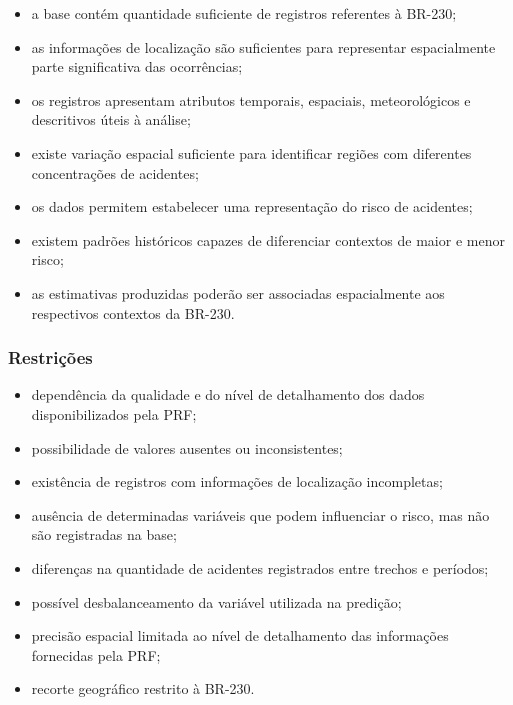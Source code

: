 \documentclass[11pt,a4paper]{article}
\begin{document}
\begin{itemize}

    \item a base contém quantidade suficiente de registros referentes à BR-230;

    \item as informações de localização são suficientes para representar espacialmente parte significativa das ocorrências;

    \item os registros apresentam atributos temporais, espaciais, meteorológicos e descritivos úteis à análise;

    \item existe variação espacial suficiente para identificar regiões com diferentes concentrações de acidentes;

    \item os dados permitem estabelecer uma representação do risco de acidentes;

    \item existem padrões históricos capazes de diferenciar contextos de maior e menor risco;

    \item as estimativas produzidas poderão ser associadas espacialmente aos respectivos contextos da BR-230.

\end{itemize}

\subsubsection*{Restrições}

\begin{itemize}

    \item dependência da qualidade e do nível de detalhamento dos dados disponibilizados pela PRF;

    \item possibilidade de valores ausentes ou inconsistentes;

    \item existência de registros com informações de localização incompletas;

    \item ausência de determinadas variáveis que podem influenciar o risco, mas não são registradas na base;

    \item diferenças na quantidade de acidentes registrados entre trechos e períodos;

    \item possível desbalanceamento da variável utilizada na predição;

    \item precisão espacial limitada ao nível de detalhamento das informações fornecidas pela PRF;

    \item recorte geográfico restrito à BR-230.

\end{itemize}
\end{document}
